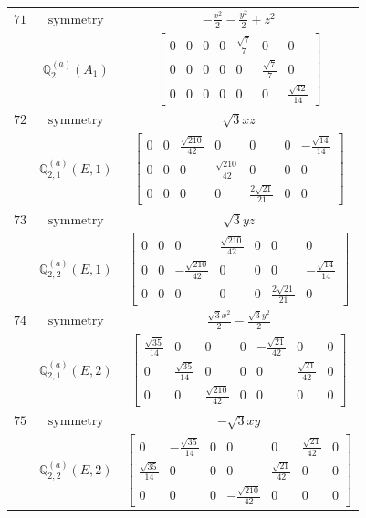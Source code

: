 \documentclass[fleqn,8pt,landscape]{jsarticle}
\begin{document}
\begin{longtable}{ccc}
$ 71 $ & $ \text{symmetry} $ & $ - \frac{x^{2}}{2} - \frac{y^{2}}{2} + z^{2} $ \\
$  $ & $ \mathbb{Q}_{2}^{(a)}(A_{1}) $ & $ \begin{bmatrix} 0 & 0 & 0 & 0 & \frac{\sqrt{7}}{7} & 0 & 0 \\ 0 & 0 & 0 & 0 & 0 & \frac{\sqrt{7}}{7} & 0 \\ 0 & 0 & 0 & 0 & 0 & 0 & \frac{\sqrt{42}}{14} \end{bmatrix} $ \\ \hline
$ 72 $ & $ \text{symmetry} $ & $ \sqrt{3} x z $ \\
$  $ & $ \mathbb{Q}_{2,1}^{(a)}(E,1) $ & $ \begin{bmatrix} 0 & 0 & \frac{\sqrt{210}}{42} & 0 & 0 & 0 & - \frac{\sqrt{14}}{14} \\ 0 & 0 & 0 & \frac{\sqrt{210}}{42} & 0 & 0 & 0 \\ 0 & 0 & 0 & 0 & \frac{2 \sqrt{21}}{21} & 0 & 0 \end{bmatrix} $ \\ \hline
$ 73 $ & $ \text{symmetry} $ & $ \sqrt{3} y z $ \\
$  $ & $ \mathbb{Q}_{2,2}^{(a)}(E,1) $ & $ \begin{bmatrix} 0 & 0 & 0 & \frac{\sqrt{210}}{42} & 0 & 0 & 0 \\ 0 & 0 & - \frac{\sqrt{210}}{42} & 0 & 0 & 0 & - \frac{\sqrt{14}}{14} \\ 0 & 0 & 0 & 0 & 0 & \frac{2 \sqrt{21}}{21} & 0 \end{bmatrix} $ \\ \hline
$ 74 $ & $ \text{symmetry} $ & $ \frac{\sqrt{3} x^{2}}{2} - \frac{\sqrt{3} y^{2}}{2} $ \\
$  $ & $ \mathbb{Q}_{2,1}^{(a)}(E,2) $ & $ \begin{bmatrix} \frac{\sqrt{35}}{14} & 0 & 0 & 0 & - \frac{\sqrt{21}}{42} & 0 & 0 \\ 0 & \frac{\sqrt{35}}{14} & 0 & 0 & 0 & \frac{\sqrt{21}}{42} & 0 \\ 0 & 0 & \frac{\sqrt{210}}{42} & 0 & 0 & 0 & 0 \end{bmatrix} $ \\ \hline
$ 75 $ & $ \text{symmetry} $ & $ - \sqrt{3} x y $ \\
$  $ & $ \mathbb{Q}_{2,2}^{(a)}(E,2) $ & $ \begin{bmatrix} 0 & - \frac{\sqrt{35}}{14} & 0 & 0 & 0 & \frac{\sqrt{21}}{42} & 0 \\ \frac{\sqrt{35}}{14} & 0 & 0 & 0 & \frac{\sqrt{21}}{42} & 0 & 0 \\ 0 & 0 & 0 & - \frac{\sqrt{210}}{42} & 0 & 0 & 0 \end{bmatrix} $ \\ \hline

\end{longtable}
\end{document}

